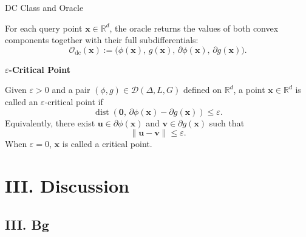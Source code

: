 \documentclass[10pt]{beamer}
\newcommand{\bx}{\mathbf{x}}
\begin{document}
\begin{frame}{DC Class and Oracle}
\footnotesize
\begin{dfn}[DC Oracle]
For each query point \(\bx\in\mathbb R^d\), the oracle returns the
values of both convex components together with their full
subdifferentials:
\[
\mathcal O_{\mathrm{dc}}(\bx)
:=
\bigl(
    \phi(\bx),\,
    g(\bx),\,
    \partial\phi(\bx),\,
    \partial g(\bx)
\bigr).
\]
\end{dfn}

\medskip
\textbf{$\varepsilon$-Critical Point}
\label{def:dc-stationary}
\par\smallskip
Given \(\varepsilon>0\) and a pair
\((\phi,g)\in\mathcal D(\Delta,L,G)\) defined on \(\mathbb R^d\), a point
\(\mathbf{x}\in\mathbb R^d\) is called an \(\varepsilon\)-critical point if
\[
\operatorname{dist}\!\left(
    \mathbf{0},\,
    \partial\phi(\mathbf{x})-\partial g(\mathbf{x})
\right)
\leq\varepsilon.
\]
Equivalently, there exist
\(\mathbf{u}\in\partial\phi(\mathbf{x})\) and
\(\mathbf{v}\in\partial g(\mathbf{x})\) such that
\[
\|\mathbf{u}-\mathbf{v}\|\leq\varepsilon.
\]
When \(\varepsilon=0\), \(\mathbf{x}\) is called a critical point.
\end{frame}

\section{III. Discussion}

\subsection{III. Bg}



\end{document}
